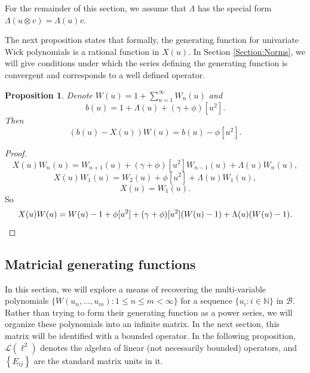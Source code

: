 \documentclass[12pt]{amsart}
\newtheorem{Prop}[Thm]{Proposition}
\theoremstyle{definition}
\newcommand{\set}[1]{\left\{#1\right\}}
\newcommand{\mf}[1]{\mathbb{#1}}
\newcommand{\mc}[1]{\mathcal{#1}}
\begin{document}
For the remainder of this section, we assume that $\Lambda$ has the special form $\Lambda(u \otimes v) = \Lambda(u) v$.

The next proposition states that formally, the generating function for univariate Wick polynomials is a rational function in $X(u)$. In Section \ref{Section:Norms}, we will give conditions under which the series defining the generating function is convergent and corresponds to a well defined operator.

\begin{Prop}
Denote $W(u) = 1 + \sum_{n=1}^\infty W_n(u)$ and
\[
b(u) = 1 + \Lambda(u) + (\gamma + \phi)[u^2].
\]
Then
\[
(b(u) - X(u)) W(u) = b(u) - \phi[u^2].
\]
\end{Prop}

\begin{proof}
\[
X(u) W_n(u) = W_{n+1}(u) + (\gamma + \phi)[u^2] W_{n-1}(u) + \Lambda(u) W_n(u),
\]
\[
X(u) W_1(u) = W_2(u) + \phi[u^2] + \Lambda(u) W_1(u),
\]
\[
X(u) = W_1(u).
\]
So
\[
X(u) W(u) = W(u) - 1 + \phi[u^2] + (\gamma + \phi)[u^2] (W(u) - 1) + \Lambda(u) (W(u) - 1). \qedhere
\]
\end{proof}





\subsection{Matricial generating functions}

In this section, we will explore a means of recovering the multi-variable polynomials $\{W(u_n, ..., u_m) : 1 \leq n \leq m < \infty \}$ for a sequence $\{u_i : i \in \mf{N}\}$ in $\mc{B}$. Rather than trying to form their generating function as a power series, we will organize these polynomials into an infinite matrix. In the next section, this matrix will be identified with a bounded operator. In the following proposition, $\mc{L}(\ell^2)$ denotes the algebra of linear (not necessarily bounded) operators, and $\set{E_{ij}}$ are the standard matrix units in it.
\end{document}
